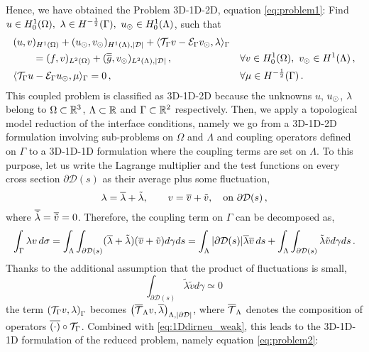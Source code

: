 Hence, we have obtained the Problem 3D-1D-2D, equation 
\eqref{eq:problem1}:
Find $u \in H^1_0(\Omega), \ \lambda \in H^{-\frac 1 2}(\Gamma ),\ u_{\odot} \in H^1_0(\Lambda)$, such that
\begin{subequations}
\begin{align*}
&(u,v)_{H^1(\Omega)} + (u_{\odot},v_{\odot})_{H^1(\Lambda),|\mathcal{D}|} 
+ \langle {\mathcal{T}_\Gamma} v  - \mathcal{E}_\Gamma v_{\odot}, \lambda \rangle_\Gamma &&
\\
\nonumber
&\qquad= (f,v)_{L^2(\Omega)} +  (\overline{\overline{g}},v_{\odot})_{L^2(\Lambda),|\mathcal{D}|}\,,
\quad &&\forall v \in H^1_0(\Omega), \ v_{\odot} \in H^1(\Lambda)\,,
\\
& \langle {\mathcal{T}_\Gamma} u - \mathcal{E}_\Gamma u_{\odot} , \mu \rangle_\Gamma = 0\,,
\quad && \forall \mu \in H^{-\frac 1 2}(\Gamma)\,.
\end{align*}
\end{subequations}
This coupled problem is classified as 3D-1D-2D because the unknowns $u$, $u_{\odot}$, $\lambda$ belong to 
$\Omega \subset \mathbb{R}^3$, $\Lambda \subset \mathbb{R}$ and $\Gamma \subset \mathbb{R}^2$ respectively.
Then, we apply a topological model reduction of the interface conditions, namely we go from a 3D-1D-2D formulation
involving sub-problems on $\Omega$ and $\Lambda$ and coupling operators defined on $\Gamma$
to a 3D-1D-1D formulation where the coupling terms are set on $\Lambda$. 
To this purpose, let us write the Lagrange multiplier and the test functions on every cross section $\partial\mathcal{D}(s)$ as their average plus some fluctuation,
\begin{equation*}
\lambda=\overline{\lambda}+\tilde{\lambda}, \qquad v=\overline{v}+\tilde{v},
\quad \text{on} \ \partial\mathcal{D}(s)\,,
\end{equation*}
where $\overline{\tilde{\lambda}}=\overline{\tilde{v}}=0$. 
Therefore, the coupling term on $\Gamma$ can be decomposed as,
\begin{equation*}
\int_{\Gamma}\lambda v\, d\sigma
=\int _{\Lambda}  \int_{\partial\mathcal{D}(s)} (\overline{\lambda}+\tilde{\lambda})(\overline{v}+\tilde{v})d\gamma ds
= \int_{\Lambda}|\partial\mathcal{D}(s)| \overline{\lambda}\overline{v}\,ds+\int_{\Lambda}  \int_{\partial\mathcal{D}(s)} \tilde{\lambda}\tilde{v}d\gamma ds\,.
\end{equation*}
Thanks to the additional assumption that the product of fluctuations is small,
\begin{equation*}
\int_{\partial\mathcal{D}(s)} \tilde{\lambda}\tilde{v} d\gamma \simeq 0\,
\end{equation*}
the term $\left({\mathcal{T}_\Gamma} v, \lambda \right)_{\Gamma}$ becomes $\left( {\overline{\mathcal{T}}_\Lambda} v, \overline{\lambda} \right)_{\Lambda, |\partial\mathcal{D}|}$, where ${\overline{\mathcal{T}}_\Lambda}$ denotes the composition of operators $\overline{(\cdot)}\circ {\mathcal{T}_\Gamma}$.  Combined with \eqref{eq:1Ddirneu_weak}, this leads to the 3D-1D-1D formulation of the reduced problem, namely equation \eqref{eq:problem2}:
